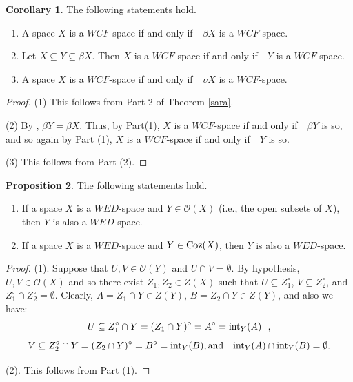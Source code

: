 \documentclass{amsart}
\theoremstyle{definition}
\theoremstyle{remark}
\numberwithin{equation}{section}
\newcommand{\CO}{\mathcal{O}}
\newcommand{\rint}{{\rm int}}
\newcommand{\coz}{{\rm Coz}}
\newcommand{\sub}{\supseteq}
\newcommand{\cc}{\circ}
\newcommand{\tohi}{\emptyset}
\def\ifif {if and only if\ \ }
\def\sub {\subseteq}
\theoremstyle{definition}\newtheorem{thm}{Theorem}[section]
\theoremstyle{definition}\newtheorem{cor}[thm]{Corollary}
\theoremstyle{definition}\newtheorem{lem}[thm]{Lemma}
\theoremstyle{definition}\newtheorem{prop}[thm]{Proposition}
\theoremstyle{definition}\newtheorem{defn}[thm]{Definition}
\theoremstyle{definition}\newtheorem{Rem}[thm]{Remark}
\theoremstyle{remark}\newtheorem{rem}[thm]{Remark}
\theoremstyle{definition}\newtheorem{exam}[thm]{Example}
\theoremstyle{definition}\newtheorem{qu}[thm]{question}
\begin{document}
\begin{cor}\label{1}
The following statements hold.
\begin{enumerate}
\item A space $X$ is a $WCF$-space \ifif $\beta X$ is a $WCF$-space.

\item Let $X\subseteq Y\subseteq\beta X$. Then $X$ is a $WCF$-space \ifif $Y$ is a $WCF$-space.

\item A  space $X$ is a $WCF$-space \ifif $\upsilon X$ is a $WCF$-space.
\end{enumerate}
\end{cor}
\begin{proof}
(1)  This follows from Part 2 of Theorem \ref{sara}.

(2) By \cite[Theorem 6.7]{GJ}, $\beta Y=\beta X$. Thus, by Part(1), $X$ is a $WCF$-space \ifif $\beta Y$ is so, and so again by Part (1), $X$ is a $WCF$-space \ifif $Y$ is so.

(3) This follows from Part (2).
\end{proof}


\begin{prop}\label{}
The following statements hold.
\begin{enumerate}
\item If a space $X$ is a $WED$-space and $Y\in\CO(X)$ (i.e., the open subsets of $X$), then $Y$ is also a $WED$-space.

\item  If a  space $X$ is a $WED$-space and $Y\in\coz(X)$, then $Y$ is also a $WED$-space.
\end{enumerate}
\end{prop}
\begin{proof}
(1). Suppose that $U,V\in\CO(Y)$ and $U\cap V=\tohi$. By hypothesis, $U,V\in\CO(X)$ and so there exist $Z_1,Z_2\in Z(X)$ such that $U\sub Z_1^\cc$, $V\sub Z_2^\cc$, and $Z_1^\cc\cap Z_2^\cc=\tohi$. Clearly, $A=Z_1\cap Y\in Z(Y)$, $B=Z_2\cap Y\in Z(Y)$, and also we have:
\[U\sub Z_1^\cc\cap Y=(Z_1\cap Y)^\cc=A^\cc=\rint_Y(A)~~,\]
\[V\sub Z_2^\cc\cap Y=(Z_2\cap Y)^\cc=B^\cc=\rint_Y(B),\text{and}\quad\rint_Y(A)\cap\rint_Y(B)=\tohi.\]

(2). This follows from Part (1).
\end{proof}
\end{document}
